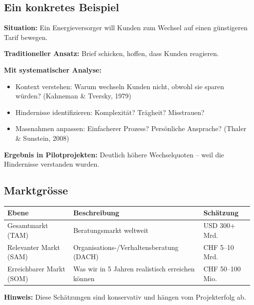 \documentclass[11pt,a4paper]{article}
\begin{document}
\subsection{Ein konkretes Beispiel}

\textbf{Situation:} Ein Energieversorger will Kunden zum Wechsel auf einen günstigeren Tarif bewegen.

\textbf{Traditioneller Ansatz:} Brief schicken, hoffen, dass Kunden reagieren.

\textbf{Mit systematischer Analyse:}
\begin{itemize}
    \item Kontext verstehen: Warum wechseln Kunden nicht, obwohl sie sparen würden? (Kahneman \& Tversky, 1979)
    \item Hindernisse identifizieren: Komplexität? Trägheit? Misstrauen?
    \item Massnahmen anpassen: Einfacherer Prozess? Persönliche Ansprache? (Thaler \& Sunstein, 2008)
\end{itemize}

\textbf{Ergebnis in Pilotprojekten:} Deutlich höhere Wechselquoten -- weil die Hindernisse verstanden wurden.

\subsection{Marktgrösse}

\begin{table}[h]
\centering
\begin{tabular}{@{}L{4cm}L{6cm}L{3cm}@{}}
\toprule
\textbf{Ebene} & \textbf{Beschreibung} & \textbf{Schätzung} \\
\midrule
Gesamtmarkt (TAM) & Beratungsmarkt weltweit & USD 300+ Mrd. \\
Relevanter Markt (SAM) & Organisations-/Verhaltensberatung (DACH) & CHF 5--10 Mrd. \\
Erreichbarer Markt (SOM) & Was wir in 5 Jahren realistisch erreichen können & CHF 50--100 Mio. \\
\bottomrule
\end{tabular}
\end{table}

\textbf{Hinweis:} Diese Schätzungen sind konservativ und hängen vom Projekterfolg ab.

\vspace{1cm}
\end{document}
